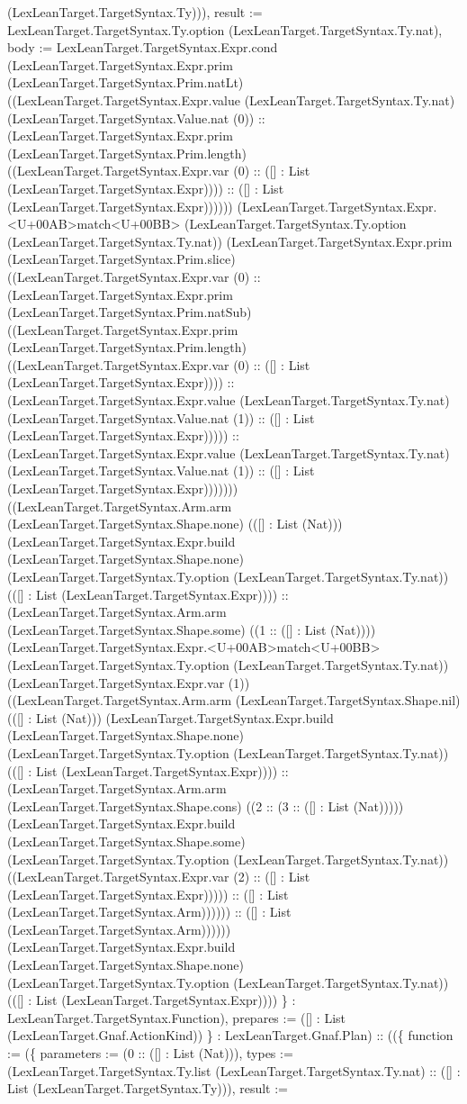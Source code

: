 \documentclass[11pt]{article}
\begin{document}
(LexLeanTarget.TargetSyntax.Ty))), result := LexLeanTarget.TargetSyntax.Ty.option (LexLeanTarget.TargetSyntax.Ty.nat), body := LexLeanTarget.TargetSyntax.Expr.cond (LexLeanTarget.TargetSyntax.Expr.prim (LexLeanTarget.TargetSyntax.Prim.natLt) ((LexLeanTarget.TargetSyntax.Expr.value (LexLeanTarget.TargetSyntax.Ty.nat) (LexLeanTarget.TargetSyntax.Value.nat (0)) :: (LexLeanTarget.TargetSyntax.Expr.prim (LexLeanTarget.TargetSyntax.Prim.length) ((LexLeanTarget.TargetSyntax.Expr.var (0) :: ([] : List (LexLeanTarget.TargetSyntax.Expr)))) :: ([] : List (LexLeanTarget.TargetSyntax.Expr)))))) (LexLeanTarget.TargetSyntax.Expr.<U+00AB>match<U+00BB> (LexLeanTarget.TargetSyntax.Ty.option (LexLeanTarget.TargetSyntax.Ty.nat)) (LexLeanTarget.TargetSyntax.Expr.prim (LexLeanTarget.TargetSyntax.Prim.slice) ((LexLeanTarget.TargetSyntax.Expr.var (0) :: (LexLeanTarget.TargetSyntax.Expr.prim (LexLeanTarget.TargetSyntax.Prim.natSub) ((LexLeanTarget.TargetSyntax.Expr.prim (LexLeanTarget.TargetSyntax.Prim.length) ((LexLeanTarget.TargetSyntax.Expr.var (0) :: ([] : List (LexLeanTarget.TargetSyntax.Expr)))) :: (LexLeanTarget.TargetSyntax.Expr.value (LexLeanTarget.TargetSyntax.Ty.nat) (LexLeanTarget.TargetSyntax.Value.nat (1)) :: ([] : List (LexLeanTarget.TargetSyntax.Expr))))) :: (LexLeanTarget.TargetSyntax.Expr.value (LexLeanTarget.TargetSyntax.Ty.nat) (LexLeanTarget.TargetSyntax.Value.nat (1)) :: ([] : List (LexLeanTarget.TargetSyntax.Expr))))))) ((LexLeanTarget.TargetSyntax.Arm.arm (LexLeanTarget.TargetSyntax.Shape.none) (([] : List (Nat))) (LexLeanTarget.TargetSyntax.Expr.build (LexLeanTarget.TargetSyntax.Shape.none) (LexLeanTarget.TargetSyntax.Ty.option (LexLeanTarget.TargetSyntax.Ty.nat)) (([] : List (LexLeanTarget.TargetSyntax.Expr)))) :: (LexLeanTarget.TargetSyntax.Arm.arm (LexLeanTarget.TargetSyntax.Shape.some) ((1 :: ([] : List (Nat)))) (LexLeanTarget.TargetSyntax.Expr.<U+00AB>match<U+00BB> (LexLeanTarget.TargetSyntax.Ty.option (LexLeanTarget.TargetSyntax.Ty.nat)) (LexLeanTarget.TargetSyntax.Expr.var (1)) ((LexLeanTarget.TargetSyntax.Arm.arm (LexLeanTarget.TargetSyntax.Shape.nil) (([] : List (Nat))) (LexLeanTarget.TargetSyntax.Expr.build (LexLeanTarget.TargetSyntax.Shape.none) (LexLeanTarget.TargetSyntax.Ty.option (LexLeanTarget.TargetSyntax.Ty.nat)) (([] : List (LexLeanTarget.TargetSyntax.Expr)))) :: (LexLeanTarget.TargetSyntax.Arm.arm (LexLeanTarget.TargetSyntax.Shape.cons) ((2 :: (3 :: ([] : List (Nat))))) (LexLeanTarget.TargetSyntax.Expr.build (LexLeanTarget.TargetSyntax.Shape.some) (LexLeanTarget.TargetSyntax.Ty.option (LexLeanTarget.TargetSyntax.Ty.nat)) ((LexLeanTarget.TargetSyntax.Expr.var (2) :: ([] : List (LexLeanTarget.TargetSyntax.Expr))))) :: ([] : List (LexLeanTarget.TargetSyntax.Arm)))))) :: ([] : List (LexLeanTarget.TargetSyntax.Arm)))))) (LexLeanTarget.TargetSyntax.Expr.build (LexLeanTarget.TargetSyntax.Shape.none) (LexLeanTarget.TargetSyntax.Ty.option (LexLeanTarget.TargetSyntax.Ty.nat)) (([] : List (LexLeanTarget.TargetSyntax.Expr)))) \} : LexLeanTarget.TargetSyntax.Function), prepares := ([] : List (LexLeanTarget.Gnaf.ActionKind)) \} : LexLeanTarget.Gnaf.Plan) :: ((\{ function := (\{ parameters := (0 :: ([] : List (Nat))), types := (LexLeanTarget.TargetSyntax.Ty.list (LexLeanTarget.TargetSyntax.Ty.nat) :: ([] : List (LexLeanTarget.TargetSyntax.Ty))), result := 
\end{document}

